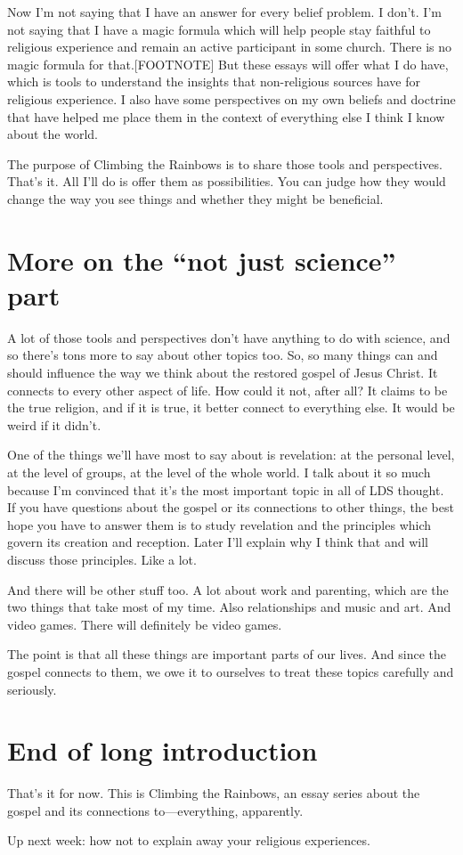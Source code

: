 Now I’m not saying that I have an answer for every belief problem. I don’t. I’m not saying that I have a magic formula which will help people stay faithful to religious experience and remain an active participant in some church. There is no magic formula for that.[FOOTNOTE] But these essays will offer what I do have, which is tools to understand the insights that non-religious sources have for religious experience. I also have some perspectives on my own beliefs and doctrine that have helped me place them in the context of everything else I think I know about the world.

The purpose of Climbing the Rainbows is to share those tools and perspectives. That’s it. All I’ll do is offer them as possibilities. You can judge how they would change the way you see things and whether they might be beneficial.

\section{More on the “not just science” part}

A lot of those tools and perspectives don’t have anything to do with science, and so there’s tons more to say about other topics too. So, so many things can and should influence the way we think about the restored gospel of Jesus Christ. It connects to every other aspect of life. How could it not, after all? It claims to be the true religion, and if it is true, it better connect to everything else. It would be weird if it didn’t.

One of the things we’ll have most to say about is revelation: at the personal level, at the level of groups, at the level of the whole world. I talk about it so much because I’m convinced that it’s the most important topic in all of LDS thought. If you have questions about the gospel or its connections to other things, the best hope you have to answer them is to study revelation and the principles which govern its creation and reception. Later I’ll explain why I think that and will discuss those principles. Like a lot.

And there will be other stuff too. A lot about work and parenting, which are the two things that take most of my time. Also relationships and music and art. And video games. There will definitely be video games.

The point is that all these things are important parts of our lives. And since the gospel connects to them, we owe it to ourselves to treat these topics carefully and seriously.

\section{End of long introduction}

That’s it for now. This is Climbing the Rainbows, an essay series about the gospel and its connections to—everything, apparently.

Up next week: how not to explain away your religious experiences.